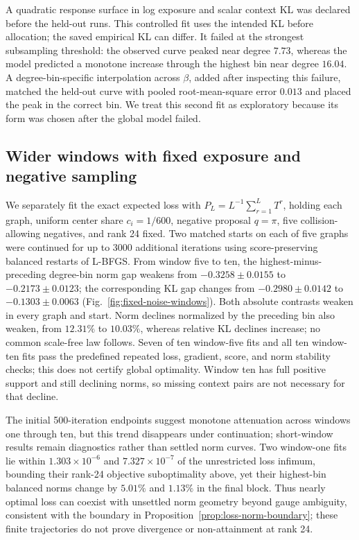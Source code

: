 \documentclass[aps,pre,reprint,superscriptaddress,longbibliography]{revtex4-2}
\begin{document}
A quadratic response surface in log exposure and scalar context KL was declared before the held-out runs.
This controlled fit uses the intended KL before allocation; the saved empirical KL can differ.
It failed at the strongest subsampling threshold: the observed curve peaked near degree \(7.73\), whereas the model predicted a monotone increase through the highest bin near degree \(16.04\).
A degree-bin-specific interpolation across \(\beta\), added after inspecting this failure, matched the held-out curve with pooled root-mean-square error \(0.013\) and placed the peak in the correct bin.
We treat this second fit as exploratory because its form was chosen after the global model failed.

\subsection{Wider windows with fixed exposure and negative sampling}
\label{sec:fixed-noise-windows}

We separately fit the exact expected loss with \(P_L=L^{-1}\sum_{r=1}^L T^r\), holding each graph, uniform center share \(c_i=1/600\), negative proposal \(q=\pi\), five collision-allowing negatives, and rank 24 fixed.
Two matched starts on each of five graphs were continued for up to 3000 additional iterations using score-preserving balanced restarts of L-BFGS.
From window five to ten, the highest-minus-preceding degree-bin norm gap weakens from \(-0.3258\pm0.0155\) to \(-0.2173\pm0.0123\); the corresponding KL gap changes from \(-0.2980\pm0.0142\) to \(-0.1303\pm0.0063\) (Fig.~\ref{fig:fixed-noise-windows}).
Both absolute contrasts weaken in every graph and start.
Norm declines normalized by the preceding bin also weaken, from \(12.31\%\) to \(10.03\%\), whereas relative KL declines increase; no common scale-free law follows.
Seven of ten window-five fits and all ten window-ten fits pass the predefined repeated loss, gradient, score, and norm stability checks; this does not certify global optimality.
Window ten has full positive support and still declining norms, so missing context pairs are not necessary for that decline.

The initial 500-iteration endpoints suggest monotone attenuation across windows one through ten, but this trend disappears under continuation; short-window results remain diagnostics rather than settled norm curves.
Two window-one fits lie within \(1.303\times10^{-6}\) and \(7.327\times10^{-7}\) of the unrestricted loss infimum, bounding their rank-24 objective suboptimality above, yet their highest-bin balanced norms change by \(5.01\%\) and \(1.13\%\) in the final block.
Thus nearly optimal loss can coexist with unsettled norm geometry beyond gauge ambiguity, consistent with the boundary in Proposition~\ref{prop:loss-norm-boundary}; these finite trajectories do not prove divergence or non-attainment at rank 24.
\end{document}
